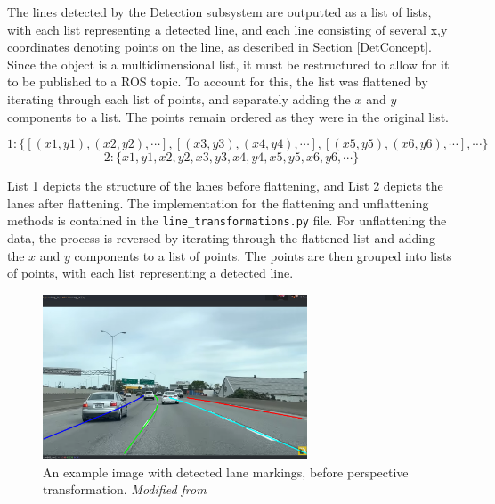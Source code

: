 \documentclass[titlepage,draft]{article}
\begin{document}
{The lines detected by the Detection subsystem are outputted as a list of lists, with each list representing a detected line, and each line consisting of several x,y coordinates denoting points on the line, as described in Section \ref{DetConcept}. Since the object is a multidimensional list, it must be restructured to allow for it to be published to a ROS topic. To account for this, the list was flattened by iterating through each list of points, and separately adding the $x$ and $y$ components to a list. The points remain ordered as they were in the original list.

\[ 1: \{[(x1, y1), (x2, y2), \cdots], [(x3, y3), (x4, y4), \cdots ], [(x5, y5), (x6, y6), \cdots], \cdots \} \]
\[ 2: \{x1, y1, x2, y2, x3, y3, x4, y4, x5, y5, x6, y6, \cdots\} \]

List 1 depicts the structure of the lanes before flattening, and List 2 depicts the lanes after flattening. The implementation for the flattening and unflattening methods is contained in the \texttt{line\_transformations.py} file. For unflattening the data, the process is reversed by iterating through the flattened list and adding the $x$ and $y$ components to a list of points. The points are then grouped into lists of points, with each list representing a detected line. 

\begin{figure}
	\centering
	\includegraphics[width=0.7\textwidth]{ikea_lines.png}
	\caption{An example image with detected lane markings, before perspective transformation.  \textit{Modified from} \cite{ikea_image}}
	\label{ikea_lines}
\end{figure}

}
\end{document}
